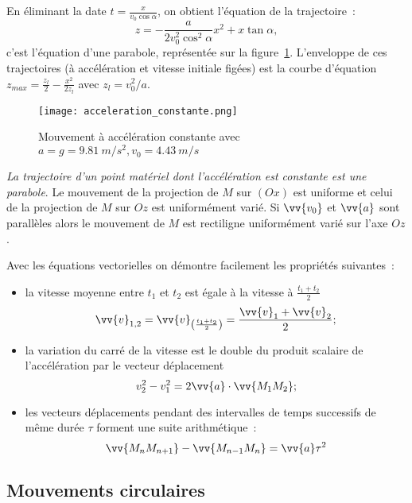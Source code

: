 En éliminant la date \(t=\frac{x}{v_0\cos\alpha}\), on obtient l'équation de la 
trajectoire~:
\begin{equation}%
  z = -\frac{a}{2v_0^2\cos^2\alpha}x^2+x\tan\alpha,
\end{equation}%
c'est l'équation d'une parabole, représentée sur la 
figure~\ref{fig:acceleration_constante}. L'enveloppe de ces trajectoires (à 
accélération et vitesse initiale figées) est la courbe d'équation \(z_{max} = 
\frac{z_l}{2} - \frac{x^2}{2 z_l}\) avec \(z_l = v_0^2/a\).%

\begin{figure}%
  \centering
  \texttt{[image: acceleration\_constante.png]}%
  \caption{Mouvement à accélération constante avec \(a = g = \SI{9,81}{m/s^2}, 
  v_0=\SI{4.43}{m/s}\)}
  \label{fig:acceleration_constante}%
\end{figure}%
\emph{La trajectoire d'un point matériel dont l'accélération est constante est 
une parabole}. Le mouvement de la projection de \(M\) sur \((Ox)\) est uniforme 
et celui de la projection de \(M\) sur \(Oz\) est uniformément varié. Si 
\(\vv{v_0}\) et \(\vv{a}\) sont parallèles alors le mouvement de \(M\) est 
rectiligne uniformément varié sur l'axe \(Oz\).

Avec les équations vectorielles on démontre facilement les propriétés 
suivantes~:
\begin{itemize}%
\item la vitesse moyenne entre \(t_1\) et \(t_2\) est égale à la vitesse à 
  \(\frac{t_1+t_2}{2}\)
  \begin{equation}%
    \vv{v}_{1,2}=\vv{v}_{\left(\frac{t_1+t_2}{2}\right)}=\frac{\vv{v}_1+\vv{v}_2}{2};%
  \end{equation}%
\item la variation du carré de la vitesse est le double du produit scalaire de 
  l'accélération par le vecteur déplacement
  \begin{equation}%
v_2^2-v_1^2=2\vv{a}\cdot \vv{M_1M_2};
  \end{equation}%
\item les vecteurs déplacements pendant des intervalles de temps successifs de 
  même durée \(\tau\) forment une suite arithmétique~:
  \begin{equation}%
    \vv{M_nM_{n+1}}-\vv{M_{n-1}M_{n}}=\vv{a}\tau^2%
  \end{equation}%
\end{itemize}%

\subsection{Mouvements circulaires}%
\label{chap1-subsec:mvtcirc}%

